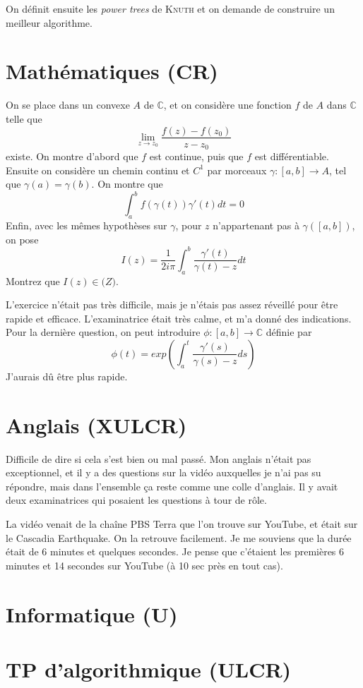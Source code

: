 \documentclass[french,a4paper, 12pt]{article}
\begin{document}
On définit ensuite les \emph{power trees} de \textsc{Knuth} et on demande de construire un meilleur algorithme.

\section*{Mathématiques (CR)}

On se place dans un convexe $A$ de $\mathbb{C}$, et on considère une fonction $f$ de $A$ dans $\mathbb{C}$ telle que $$ \lim_{z\rightarrow z_0}{\frac{f(z) - f(z_0)}{z - z_0}} $$ existe. On montre d'abord que $f$ est continue, puis que $f$ est différentiable. Ensuite on considère un chemin continu et $C^1$ par morceaux $\gamma : [a, b] \rightarrow A$, tel que $\gamma(a) = \gamma(b)$. On montre que $$\int_a^bf(\gamma(t))\gamma'(t)dt = 0$$ Enfin, avec les mêmes hypothèses sur $\gamma$, pour $z$ n'appartenant pas à $\gamma([a, b])$, on pose $$I(z)=\frac{1}{2i\pi}\int_a^b\frac{\gamma'(t)}{\gamma(t)-z}dt$$ Montrez que $I(z)\in\mathbb(Z)$.

L'exercice n'était pas très difficile, mais je n'étais pas assez réveillé pour être rapide et efficace. L'examinatrice était très calme, et m'a donné des indications. Pour la dernière question, on peut introduire $\phi : [a, b] \rightarrow \mathbb{C}$ définie par $$\phi(t) = exp(\int_a^t\frac{\gamma'(s)}{\gamma(s)-z}ds)$$
J'aurais dû être plus rapide.

\section*{Anglais (XULCR)}

Difficile de dire si cela s'est bien ou mal passé. Mon anglais n'était pas exceptionnel, et il y a des questions sur la vidéo auxquelles je n'ai pas su répondre, mais dans l'ensemble ça reste comme une colle d'anglais. Il y avait deux examinatrices qui posaient les questions à tour de rôle.

La vidéo venait de la chaîne PBS Terra que l'on trouve sur YouTube, et était sur le Cascadia Earthquake. On la retrouve facilement. Je me souviens que la durée était de 6 minutes et quelques secondes. Je pense que c'étaient les premières 6 minutes et 14 secondes sur YouTube (à 10 sec près en tout cas).

\section*{Informatique (U)}

\section*{TP d'algorithmique (ULCR)}
\end{document}
